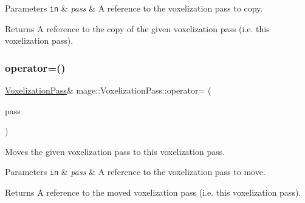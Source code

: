 \begin{DoxyParams}[1]{Parameters}
\mbox{\tt in}  & {\em pass} & A reference to the voxelization pass to copy. \\
\hline
\end{DoxyParams}
\begin{DoxyReturn}{Returns}
A reference to the copy of the given voxelization pass (i.\+e. this voxelization pass). 
\end{DoxyReturn}
\hypertarget{classmage_1_1_voxelization_pass_a5709a9237fff8f338adef77c57752d2a}{}\label{classmage_1_1_voxelization_pass_a5709a9237fff8f338adef77c57752d2a} 
\subsubsection{\texorpdfstring{operator=()}{operator=()}\hspace{0.1cm}{\footnotesize\ttfamily [2/2]}}
{\footnotesize\ttfamily \hyperlink{classmage_1_1_voxelization_pass}{Voxelization\+Pass}\& mage\+::\+Voxelization\+Pass\+::operator= (\begin{DoxyParamCaption}\item[{\hyperlink{classmage_1_1_voxelization_pass}{Voxelization\+Pass} \&\&}]{pass }\end{DoxyParamCaption})\hspace{0.3cm}{\ttfamily [delete]}}

Moves the given voxelization pass to this voxelization pass.


\begin{DoxyParams}[1]{Parameters}
\mbox{\tt in}  & {\em pass} & A reference to the voxelization pass to move. \\
\hline
\end{DoxyParams}
\begin{DoxyReturn}{Returns}
A reference to the moved voxelization pass (i.\+e. this voxelization pass). 
\end{DoxyReturn}
\hypertarget{classmage_1_1_voxelization_pass_a17aa06fc842286e00750501b3f1f0f8b}{}\label{classmage_1_1_voxelization_pass_a17aa06fc842286e00750501b3f1f0f8b} 
